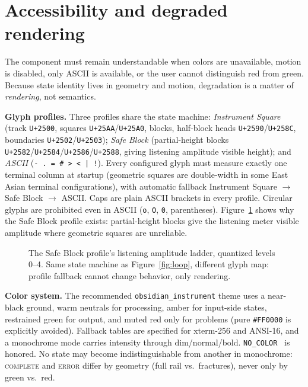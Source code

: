 \documentclass[11pt]{article}
\newcommand{\railstate}[1]{\textsc{#1}}
\begin{document}
\section{Accessibility and degraded rendering}
\label{sec:accessibility}
\label{sec:profiles}

The component must remain understandable when colors are unavailable,
motion is disabled, only ASCII is available, or the user cannot
distinguish red from green. Because state identity lives in geometry and
motion, degradation is a matter of \emph{rendering}, not semantics.

\textbf{Glyph profiles.} Three profiles share the state machine:
\emph{Instrument Square} (track \texttt{U+2500}, squares
\texttt{U+25AA}/\texttt{U+25A0}, blocks, half-block heads
\texttt{U+2590}/\texttt{U+258C}, boundaries \texttt{U+2502}/\texttt{U+2503});
\emph{Safe Block} (partial-height blocks
\texttt{U+2582}/\texttt{U+2584}/\texttt{U+2586}/\texttt{U+2588}, giving
listening amplitude visible height); and \emph{ASCII}
(\texttt{-\ .\ =\ \#\ >\ <\ |\ !}). Every configured glyph must measure
exactly one terminal column at startup (geometric squares are double-width in some East Asian terminal configurations), with automatic fallback Instrument Square $\rightarrow$ Safe Block $\rightarrow$ ASCII.
Caps are plain ASCII brackets in every profile. Circular glyphs are
prohibited even in ASCII (\texttt{o}, \texttt{O}, \texttt{0},
parentheses). Figure~\ref{fig:ladder} shows why the Safe Block profile exists: partial-height blocks give the listening meter
visible amplitude where geometric squares are unreliable.

\begin{figure}[t]
\centering
{\setlength{\fboxsep}{10pt}%
\colorbox{railbg}{\parbox{\dimexpr\linewidth-20pt\relax}{%
\railfont\footnotesize
}}}
\caption{The Safe Block profile's listening amplitude ladder, quantized
levels 0--4. Same state machine as Figure~\ref{fig:loop}, different glyph map: profile fallback cannot change behavior, only rendering.}
\label{fig:ladder}
\end{figure}

\textbf{Color system.} The recommended \texttt{obsidian\_instrument}
theme uses a near-black ground, warm neutrals for processing, amber for
input-side states, restrained green for output, and muted red only for
problems (pure \texttt{\#FF0000} is explicitly avoided). Fallback tables
are specified for xterm-256 and ANSI-16, and a monochrome mode carries
intensity through dim/normal/bold. \texttt{NO\_COLOR}~\cite{nocolor} is
honored. No state may become indistinguishable from another
in monochrome: \railstate{complete} and \railstate{error} differ by
geometry (full rail vs.\ fractures), never only by green vs.\ red.
\end{document}
